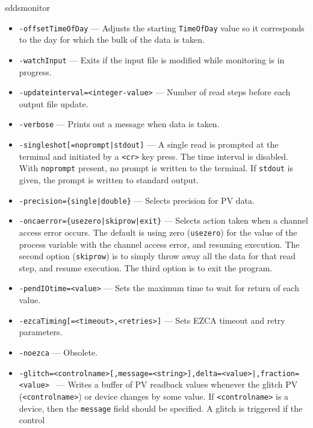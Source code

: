 \begin{sddsprog}{sddsmonitor}
\begin{itemize}
  \item {\tt -offsetTimeOfDay} --- Adjusts the starting \verb+TimeOfDay+ value so it corresponds
                to the day for which the bulk of the data is taken.
  \item {\tt -watchInput} --- Exits if the input file is modified while monitoring is in progress.
  \item {\tt -updateinterval=<integer-value>} --- Number of read steps before each output file update.
  \item {\tt -verbose} --- Prints out a message when data is taken.
  \item {\verb+-singleshot[=noprompt|stdout]+} --- A single read is prompted at the terminal
                and initiated by a \verb+<cr>+ key press. The time interval is disabled.
                With \verb+noprompt+ present, no prompt is written to the terminal. If \verb+stdout+
                is given, the prompt is written to standard output.
  \item {\verb+-precision={single|double}+} --- Selects precision for PV data.
  \item {\verb+-oncaerror={usezero|skiprow|exit}+} --- Selects action taken when a channel access error occurs.
                The default is using zero (\verb+usezero+) for the value of the process variable
                with the channel access error, and resuming execution. The second option (\verb+skiprow+) is to
                simply throw away all the data for that read step, and resume execution.
                The third option is to exit the program.
  \item {\tt -pendIOtime=<value>} --- Sets the maximum time to wait for return of each value.
  \item {\tt -ezcaTiming[=<timeout>,<retries>]} --- Sets EZCA timeout and retry parameters.
  \item {\tt -noezca} --- Obsolete.
  \item {\tt -glitch=<controlname>[,message=<string>]{,delta=<value>|,fraction=<value>} \newline
      [,before=<number>][,after=<number>][,{baseline=<number>|filterFraction=<value>}] \newline
      [,sign={+|-}][,noReset][,{autoHoldoff|holdoff=<seconds>}]} ---
                Writes a buffer of PV readback values whenever the glitch PV (\verb+<controlname>+) or
                device changes by some value. If \verb+<controlname>+ is a device, then the \verb+message+ field
                should be specified. A glitch is triggered if the control

\end{itemize}
\end{sddsprog}
